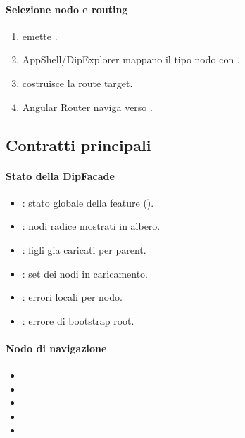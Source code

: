 \paragraph{Selezione nodo e routing}
\begin{enumerate}[labelwidth=0.8cm,leftmargin=1cm]
	\item {} emette .
	\item AppShell/DipExplorer mappano il tipo nodo con .
	\item {} costruisce la route target.
	\item Angular Router naviga verso .
\end{enumerate}

\subsection{Contratti principali}

\paragraph{Stato della DipFacade}
\begin{itemize}
	\item {}: stato globale della feature ().
	\item {}: nodi radice mostrati in albero.
	\item {}: figli gia caricati per parent.
	\item {}: set dei nodi in caricamento.
	\item {}: errori locali per nodo.
	\item {}: errore di bootstrap root.
\end{itemize}

\paragraph{Nodo di navigazione}
\begin{itemize}
	\item {}
	\item {}
	\item {}
	\item {}
	\item {}
\end{itemize}


